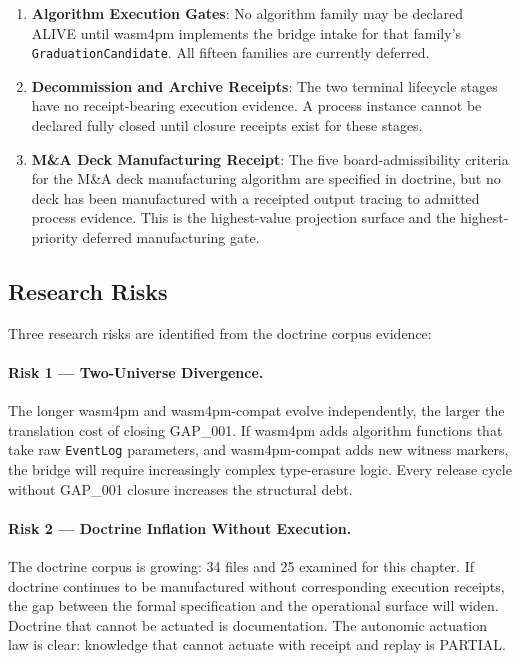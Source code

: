 \begin{enumerate}
  \item \textbf{Algorithm Execution Gates}: No algorithm family may be declared ALIVE until
    wasm4pm implements the bridge intake for that family's \texttt{GraduationCandidate}.
    All fifteen families are currently deferred.
  \item \textbf{Decommission and Archive Receipts}: The two terminal lifecycle stages have
    no receipt-bearing execution evidence. A process instance cannot be declared fully closed
    until closure receipts exist for these stages.
  \item \textbf{M\&A Deck Manufacturing Receipt}: The five board-admissibility criteria
    for the M\&A deck manufacturing algorithm are specified in doctrine, but no deck has been
    manufactured with a receipted output tracing to admitted process evidence. This is the
    highest-value projection surface and the highest-priority deferred manufacturing gate.
\end{enumerate}

\subsection{Research Risks}
\label{sec:doctrine-open-risks}

Three research risks are identified from the doctrine corpus evidence:

\paragraph{Risk 1 --- Two-Universe Divergence.} The longer wasm4pm and wasm4pm-compat evolve
independently, the larger the translation cost of closing GAP\_001. If wasm4pm adds
algorithm functions that take raw \texttt{EventLog} parameters, and wasm4pm-compat adds new
witness markers, the bridge will require increasingly complex type-erasure logic. Every
release cycle without GAP\_001 closure increases the structural debt.

\paragraph{Risk 2 --- Doctrine Inflation Without Execution.} The doctrine corpus is growing:
34 files and 25 examined for this chapter. If doctrine continues to be manufactured without
corresponding execution receipts, the gap between the formal specification and the operational
surface will widen. Doctrine that cannot be actuated is documentation. The autonomic
actuation law is clear: knowledge that cannot actuate with receipt and replay is PARTIAL.

